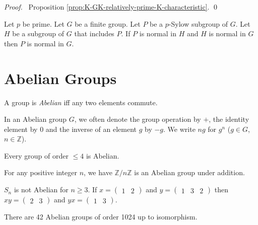\begin{proof}
\pf\ Proposition \ref{prop:K-GK-relatively-prime-K-characteristic}. \qed
\end{proof}

\begin{cor}
\label{cor:normal-normal-normal}
Let $p$ be prime. Let $G$ be a finite group. Let $P$ be a $p$-Sylow subgroup of $G$. Let $H$ be a subgroup of $G$ that includes $P$. If $P$ is normal in $H$ and $H$ is normal in $G$ then $P$ is normal in $G$.
\end{cor}

\chapter{Abelian Groups}

\begin{df}
    A group is \emph{Abelian} iff any two elements commute.
\end{df}

In an Abelian group $G$, we often denote the group operation by $+$, the
identity element by $0$ and the inverse of an element $g$ by $-g$. We write
$ng$ for $g^n$ ($g \in G$, $n \in \mathbb{Z}$).

\begin{ex}
    Every group of order $\leq 4$ is Abelian.
\end{ex}

\begin{ex}
    For any positive integer $n$, we have $\mathbb{Z} / n \mathbb{Z}$ is an Abelian group under addition.
\end{ex}

\begin{ex}
    $S_n$ is not Abelian for $n \geq 3$. If $x = \left( \begin{array}{cc} 1 & 2 \end{array} \right)$ and $y = \left( \begin{array}{ccc} 1 & 3 & 2 \end{array} \right)$ then $xy = \left( \begin{array}{cc} 2 & 3 \end{array} \right)$ and $yx = \left( \begin{array}{cc} 1 & 3 \end{array} \right)$.
\end{ex}

\begin{ex}
There are 42 Abelian groups of order 1024 up to isomorphism. %
\end{ex}

